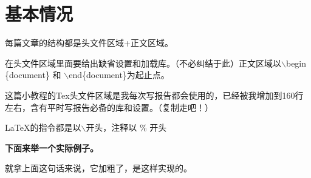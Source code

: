 \documentclass[12pt,a4paper,oneside]{book}
\begin{document}
\section{基本情况}
每篇文章的结构都是{\color{magenta}头文件区域}+\textcolor[RGB]{90,90,90}{正文区域}。
\par
在头文件区域里面要给出缺省设置和加载库。（不必纠结于此）正文区域以$\backslash$begin \{document\} 和 $\backslash$end\{document\}为起止点。
\par
这篇小教程的Tex头文件区域是我每次写报告都会使用的，已经被我增加到160行左右，含有平时写报告必备的库和设置。（复制走吧！）
\par
\LaTeX 的指令都是以$\backslash$开头，注释以 \% 开头
\par

{\bfseries {下面来举一个实际例子。}}
\par
就拿上面这句话来说，它加粗了，是这样实现的。
\par
\end{document}
